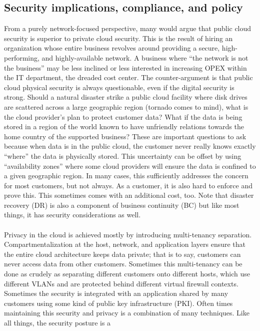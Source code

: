 \subsection{Security implications, compliance, and policy}
From a purely network-focused perspective, many would argue that public cloud
security is superior to private cloud security. This is the result of hiring
an organization whose entire business revolves around providing a secure,
high-performing, and highly-available network. A business where ``the network
is not the business'' may be less inclined or less interested in increasing
OPEX within the IT department, the dreaded cost center. The counter-argument
is that public cloud physical security is always questionable, even if the
digital security is strong. Should a natural disaster strike a public cloud
facility where disk drives are scattered across a large geographic region
(tornado comes to mind), what is the cloud provider’s plan to protect customer
data? What if the data is being stored in a region of the world known to have
unfriendly relations towards the home country of the supported business? These
are important questions to ask because when data is in the public cloud, the
customer never really knows exactly ``where'' the data is physically stored.
This uncertainty can be offset by using ``availability zones'' where some cloud
providers will ensure the data is confined to a given geographic region. In
many cases, this sufficiently addresses the concern for most customers, but
not always. As a customer, it is also hard to enforce and prove this. This
sometimes comes with an additional cost, too. Note that disaster recovery (DR)
is also a component of business continuity (BC) but like most things, it has
security considerations as well.
\\ \\
Privacy in the cloud is achieved mostly by introducing multi-tenancy
separation. Compartmentalization at the host, network, and application layers
ensure that the entire cloud architecture keeps data private; that is to say,
customers can never access data from other customers. Sometimes this
multi-tenancy can be done as crudely as separating different customers onto
different hosts, which use different VLANs and are protected behind different
virtual firewall contexts. Sometimes the security is integrated with an
application shared by many customers using some kind of public key
infrastructure (PKI). Often times maintaining this security and privacy is a
combination of many techniques. Like all things, the security posture is a
